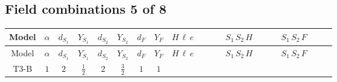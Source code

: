 \documentclass[8pt]{article}
\begin{document}
\begin{landscape}
\subsection*{Field combinations 5 of 8}
\begin{longtable}{@{}cccccccc >{\raggedright\arraybackslash}p{0.21\linewidth} >{\raggedright\arraybackslash}p{0.21\linewidth} >{\raggedright\arraybackslash}p{0.21\linewidth}@{}}
\toprule
Model & $\alpha$ & $d_{S_1}$ & $Y_{S_1}$ & $d_{S_2}$ & $Y_{S_2}$ & $d_F$ & $Y_F$ & $H\,\ell\,e$ & $S_1\,S_2\,H$ & $S_1\,S_2\,F$ \\
\midrule
\endfirsthead
\toprule
Model & $\alpha$ & $d_{S_1}$ & $Y_{S_1}$ & $d_{S_2}$ & $Y_{S_2}$ & $d_F$ & $Y_F$ & $H\,\ell\,e$ & $S_1\,S_2\,H$ & $S_1\,S_2\,F$ \\
\midrule
\endhead
T3-B & $1$ & $2$ & $\frac{1}{2}$ & $2$ & $\frac{3}{2}$ & $1$ & $1$ & \scriptsize\adjustbox{max width=\linewidth}{$\begin{gathered} +\frac{\hbar  \overline{y_{1,i_3,r_1}} \overline{L_{a_1,i_2}}\, P_R\, e_{i_1} H_{a_1} y_{1,i_2,r_1} Y_{e,i_3,i_1}}{4 \epsilon } \\ +\frac{3}{8} \hbar  \overline{y_{1,i_3,r_1}} \overline{L_{a_1,i_2}}\, P_R\, e_{i_1} H_{a_1} y_{1,i_2,r_1} Y_{e,i_3,i_1} \\ +\frac{\hbar  \overline{y_{2,i_3,r_1}} \overline{L_{a_1,i_2}}\, P_R\, e_{i_1} H_{a_1} y_{2,i_2,r_1} Y_{e,i_3,i_1}}{4 \epsilon }\end{gathered}$} & \scriptsize\adjustbox{max width=\linewidth}{$\begin{gathered} +\overline{\lambda_5} S_{2,j_2} {\mathcal{I}_{LLS_1S_2}}^{*}_{a_1,a_2,j_1,j_2} H_{a_1}{}^{\dagger } H_{a_2}{}^{\dagger } S_{1,j_1}{}^{\dagger } \\ -\frac{\hbar  \overline{y_{1,i_1,r_1}} \overline{\lambda_5} S_{2,j_2} y_{1,i_1,r_1} {\mathcal{I}_{LLS_1S_2}}^{*}_{a_1,a_2,j_1,j_2} H_{a_1}{}^{\dagger } H_{a_2}{}^{\dagger } S_{1,j_1}{}^{\dagger }}{2 \epsilon } \\ -\frac{1}{4} \hbar  \overline{y_{1,i_1,r_1}} \overline{\lambda_5} S_{2,j_2} y_{1,i_1,r_1} {\mathcal{I}_{LLS_1S_2}}^{*}_{a_1,a_2,j_1,j_2} H_{a_1}{}^{\dagger } H_{a_2}{}^{\dagger } S_{1,j_1}{}^{\dagger }\end{gathered}$} & \scriptsize\adjustbox{max width=\linewidth}{$\begin{gathered} +2 \hbar  \log \left(\frac{\bar{\mu}^{2}}{M_F^2}\right) \overline{y_{1,i_1,r_1}} \overline{y_{2,i_2,r_2}} S_{1,j_2} S_{2,j_1} y_{1,i_2,r_1} y_{2,i_1,r_2} S_{1,j_1}{}^{\dagger } S_{2,j_2}{}^{\dagger } \\ -2 \hbar  \log \left(\frac{\bar{\mu}^{2}}{M_F^2}\right) \overline{y_{1,i_1,r_1}} \overline{y_{2,i_2,r_2}} S_{1,j_1} S_{2,j_2} y_{1,i_2,r_1} y_{2,i_1,r_2} S_{1,j_1}{}^{\dagger } S_{2,j_2}{}^{\dagger } \\ -\hbar  \log \left(\frac{\bar{\mu}^{2}}{M_F^2}\right) \overline{y_{1,i_1,r_1}} S_{1,j_4} S_{2,j_3} y_{1,i_1,r_1} S_{1,j_1}{}^{\dagger } S_{2,j_2}{}^{\dagger } \mathcal{I}_{12,j_2,j_3,j_1,j_4}{}^1 \lambda_{12}^{(1)}^{(1)}\end{gathered}$} \\

\end{longtable}
\end{landscape}
\end{document}

